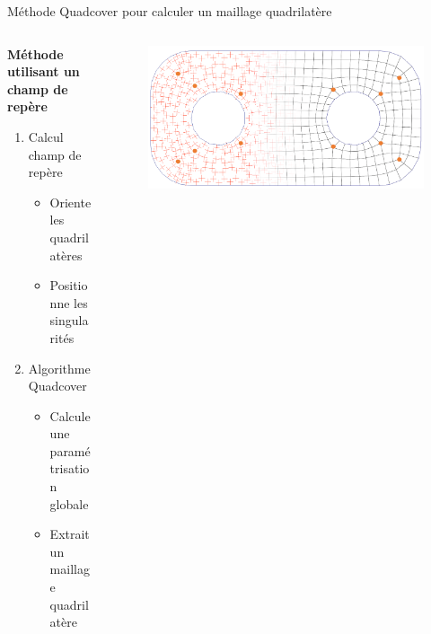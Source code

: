 \begin{frame}{Méthode Quadcover pour calculer un maillage quadrilatère}
    \begin{columns}[c] %
        
        \begin{column}{.7\textwidth}
            \textbf{Méthode utilisant un champ de repère}
            \vspace{1em}
            \begin{enumerate}
                \item Calcul champ de repère
                \begin{itemize}
                    \item Oriente les quadrilatères
                    \item Positionne les singularités
                \end{itemize}
                \vspace{.5em}
                \item Algorithme Quadcover
                \begin{itemize}
                    \item Calcule une paramétrisation globale
                    \item Extrait un maillage quadrilatère
                \end{itemize}
            \end{enumerate}
        \end{column}%
        
        \begin{column}{.3\textwidth}
            \begin{figure}
                \centering
                \includegraphics[width=1.8\linewidth, angle=-90]{img/quadsimu/singus.PNG}
            \end{figure}
        \end{column}
        
    \end{columns}
\end{frame}

